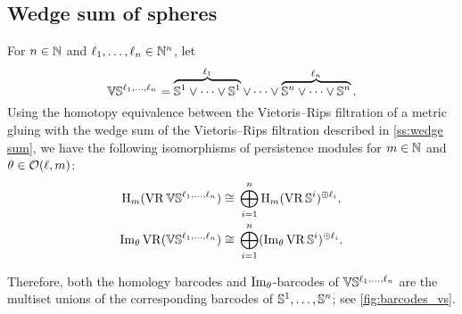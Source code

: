 


\subsection{Wedge sum of spheres}


For $n \in \mathbb{N}$ and $\ell_1, \dots, \ell_n \in \mathbb{N}^n$, let
\[
\mathbb{V}\mathbb{S}^{\ell_1,\dots,\ell_n} =
\overbrace{\mathbb{S}^1\vee\dots\vee\mathbb{S}^1}^{\ell_1} \vee\dots\vee \overbrace{\mathbb{S}^n\vee\dots\vee\mathbb{S}^n}^{\ell_n}.
\]
Using the homotopy equivalence between the Vietoris--Rips filtration of a metric gluing with the wedge sum of the Vietoris--Rips filtration described in \cref{ss:wedge sum}, we have the following isomorphisms of persistence modules for \(m \in \mathbb{N}\) and \(\theta \in \mathcal{O}(\ell,m)\):
\[
\begin{split}
	\mathrm{H}_m (\operatorname{VR}\mathbb{V}\mathbb{S}^{\ell_1,\dots,\ell_n}) &\cong \, \bigoplus_{i=1}^n \mathrm{H}_m (\operatorname{VR}\mathbb{S}^i)^{\oplus \ell_i}, \\
	\operatorname{Im}_\theta \operatorname{VR}(\mathbb{V}\mathbb{S}^{\ell_1,\dots,\ell_n}) &\cong \, \bigoplus_{i=1}^n (\operatorname{Im}_\theta \operatorname{VR}\mathbb{S}^i)^{\oplus \ell_i}.
\end{split}
\]

Therefore, both the homology barcodes and \(\operatorname{Im}_\theta\)-barcodes of \(\mathbb{V}\mathbb{S}^{\ell_1, \dots, \ell_n}\) are the multiset unions of the corresponding barcodes of \(\mathbb{S}^1, \dots, \mathbb{S}^n\); see \cref{fig:barcodes_vs}.

